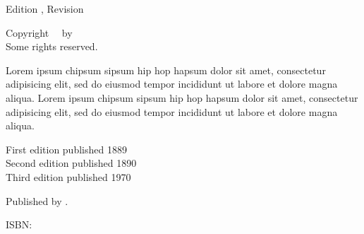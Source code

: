 \clearpage

\begingroup
  \null\vfill\small

  \utitle\par
  Edition \uedition, Revision \urevision\par
  Copyright \textcopyright\ \udate\ by \uauthor\\
  Some rights reserved.\par

  Lorem ipsum chipsum sipsum hip hop hapsum dolor sit amet, consectetur adipisicing elit, sed do eiusmod tempor incididunt ut labore et dolore magna aliqua. Lorem ipsum chipsum sipsum hip hop hapsum dolor sit amet, consectetur adipisicing elit, sed do eiusmod tempor incididunt ut labore et dolore magna aliqua.\par

  First edition published 1889\\
  Second edition published 1890\\
  Third edition published 1970\par
  
  Published by \upublisher.\par
  ISBN: \uisbn\par

  \uwebsite\par
\endgroup

\clearpage